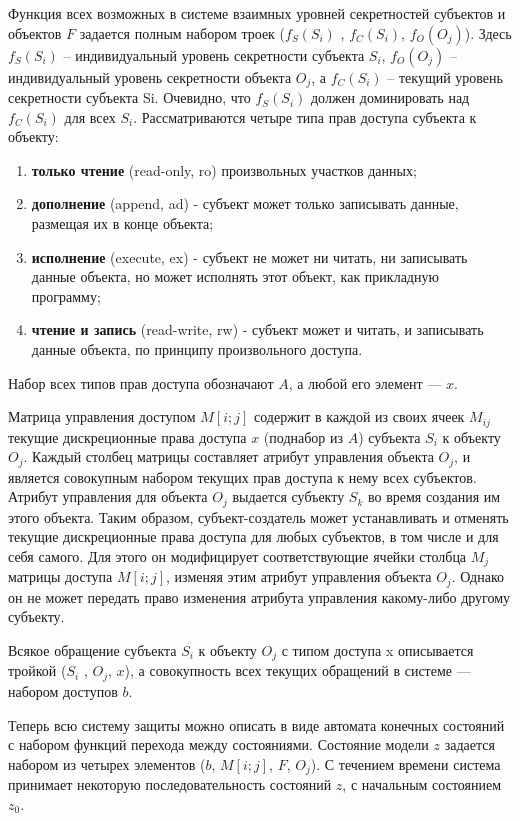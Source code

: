Функция всех возможных в системе взаимных уровней секретностей субъектов и объектов $F$ задается полным набором троек ($f_S(S_i)$ , $f_C(S_i)$, $f_O(O_j)$). Здесь $f_S(S_i)$ – индивидуальный уровень секретности субъекта $S_i$, $f_O(O_j)$ – индивидуальный уровень секретности объекта $O_j$, а $f_C(S_i)$ – текущий уровень секретности субъекта Si. Очевидно, что $f_S(S_i)$ должен доминировать над $f_C(S_i)$ для всех $S_i$. Рассматриваются четыре типа прав доступа субъекта к объекту:

\begin{enumerate}
	\item\textbf{только чтение} (read-only, ro) произвольных участков данных;
	\item\textbf{дополнение} (append, ad) - субъект может только записывать данные, размещая их в конце объекта;
	\item\textbf{исполнение} (execute, ex) - субъект не может ни читать, ни записывать данные объекта, но может исполнять этот объект, как прикладную программу;
	\item\textbf{чтение и запись} (read-write, rw) - субъект может и читать, и записывать данные объекта, по принципу произвольного доступа.
\end{enumerate}

Набор всех типов прав доступа обозначают $A$, а любой его элемент --- $x$.

Матрица управления доступом $M[i;j]$ содержит в каждой из своих ячеек $M_{ij}$ текущие дискреционные права доступа $x$ (поднабор из $A$) субъекта $S_i$ к объекту $O_j$. Каждый столбец матрицы составляет атрибут управления объекта $O_j$, и является совокупным набором текущих прав доступа к нему всех субъектов. Атрибут управления для объекта $O_j$ выдается субъекту $S_k$ во время создания им этого объекта. Таким образом, субъект-создатель может устанавливать и отменять текущие дискреционные права доступа для любых субъектов, в том числе и для себя самого. Для этого он модифицирует соответствующие ячейки столбца $M_j$ матрицы доступа $M[i;j]$, изменяя этим атрибут управления объекта $O_j$. Однако он не может передать право изменения атрибута управления какому-либо другому субъекту.

Всякое обращение субъекта $S_i$ к объекту $O_j$ с типом доступа x описывается тройкой ($S_i$ , $O_j$, $x$), а совокупность всех текущих обращений в системе --- набором доступов $b$.

Теперь всю систему защиты можно описать в виде автомата конечных состояний с набором функций перехода между состояниями. Состояние модели $z$ задается набором из четырех элементов ($b$, $M[i;j]$, $F$,  $O_j$). С течением времени система принимает некоторую последовательность состояний $z$, с начальным состоянием $z_0$.

